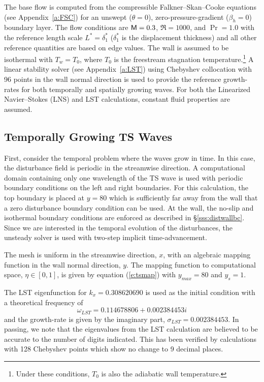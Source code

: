 The base flow is computed from the compressible Falkner--Skan--Cooke equations
(see Appendix~\ref{a:FSC}) for an unswept ($\theta=0$), zero-pressure-gradient
($\beta_h=0$) boundary layer.  The flow conditions are ${\sf M}=0.3$, $\Re=1000$,
and $\Pr=1.0$ with the reference length scale $L^*=\delta^*_1$ ($\delta^*_1$
is the displacement thickness) and all other reference quantities are based on
edge values.  The wall is assumed to be isothermal with $T_w = T_0$, where
$T_0$ is the freestream stagnation temperature.\footnote{Under these
conditions, $T_0$ is also the adiabatic wall temperature.}  A linear stability
solver (see Appendix~\ref{a:LST}) using Chebyshev collocation with 96 points
in the wall normal direction is used to provide the reference growth-rates for
both temporally and spatially growing waves.  For both the Linearized
Navier--Stokes (LNS) and LST calculations, constant fluid properties are
assumed.

\subsection{Temporally Growing TS Waves \label{ss:TStime}}

First, consider the temporal problem where the waves grow in time. In this
case, the disturbance field is periodic in the streamwise direction.  A
computational domain containing only one wavelength of the TS wave is used
with periodic boundary conditions on the left and right boundaries.  For this
calculation, the top boundary is placed at $y=80$ which is sufficiently far
away from the wall that a zero disturbance boundary condition can be used.  At
the wall, the no-slip and isothermal boundary conditions are enforced as
described in \S\ref{sss:distwallbc}.  Since we are interested in the temporal
evolution of the disturbances, the unsteady solver is used with two-step
implicit time-advancement.

The mesh is uniform in the streamwise direction, $x$, with an algebraic
mapping function in the wall normal direction, $y$.  The mapping function to
computational space, $\eta \in [0,1]$, is given by equation (\ref{e:tsmap})
with $y_{max}=80$ and $y_s=1$.

The LST eigenfunction for $k_x = 0.308620690$ is used as the initial condition
with a theoretical frequency of
%
%
%
%
%
\begin{equation}
  \omega_{LST} = 0.114678806 +  0.002384453 i
\end{equation}
%
and the growth-rate is given by the imaginary part, $\sigma_{LST} =
0.002384453$.  In passing, we note that the eigenvalues from the LST
calculation are believed to be accurate to the number of digits indicated.
This has been verified by calculations with 128 Chebyshev points which show no
change to 9 decimal places.

